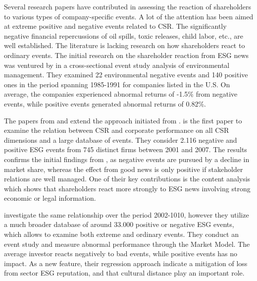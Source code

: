 





Several research papers have contributed in assessing the reaction of shareholders to various types of company-specific events. A lot of the attention has been aimed at extreme positive and negative events related to CSR. The significantly negative financial repercussions of oil spills, toxic releases, child labor, etc., are well established. The literature is lacking research on how shareholders react to ordinary events. The initial research on the shareholder reaction from ESG news was ventured by \cite{klassen1996impact} in a cross-sectional event study analysis of environmental management. They examined 22 environmental negative events and 140 positive ones in the period spanning 1985-1991 for companies listed in the U.S. On average, the companies experienced abnormal returns of -1.5\% from negative events, while positive events generated abnormal returns of 0.82\%.    

The papers from \cite{Blancard_ESG_sentiment} and \cite{kruger2015corporate} extend the approach initiated from \citeauthor{klassen1996impact}. \citeauthor{kruger2015corporate} is the first paper to examine the relation between CSR and corporate performance on all CSR dimensions and a large database of events. They consider 2.116 negative and positive ESG events from 745 distinct firms between 2001 and 2007. The results confirms the initial findings from \citeauthor{klassen1996impact}, as negative events are pursued by a decline in market share, whereas the effect from good news is only positive if stakeholder relations are well managed. One of their key contributions is the content analysis which shows that shareholders react more strongly to ESG news involving strong economic or legal information. 

\citeauthor{Blancard_ESG_sentiment} investigate the same relationship over the period 2002-1010, however they utilize a much broader database of around 33.000 positive or negative ESG events, which allows to examine both extreme and ordinary events. They conduct an event study and measure abnormal performance through the Market Model. The average investor reacts negatively to bad events, while positive events has no impact. As a new feature, their regression approach indicate a mitigation of loss from sector ESG reputation, and that cultural distance play an important role. 

